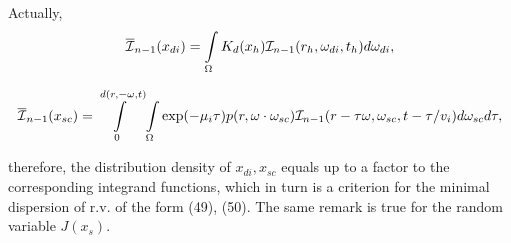 \documentclass[12pt,reqno]{report}
\begin{document}
Actually,
\begin{equation}
{\overline{\cal I}_{n-1}(x_{di})} = 
\int\limits_{\Omega} K_d(x_h) {\cal I}_{n-1}(r_h, \omega_{di}, t_h)d\omega_{di},
\end{equation}

\begin{equation}
{\overline{\cal I}_{n-1}(x_{sc})} = 
\int \limits^{d(r,-\omega,t)}_0 \int\limits_{\Omega} \exp(- \mu_i \tau) 
p(r,\omega \cdot\omega_{sc}) {\cal I}_{n-1}(r-\tau\omega,\omega_{sc},t-\tau/v_i)d\omega_{sc}d\tau ,
\end{equation}

therefore, the distribution density of $x_{di}, x_{sc}$ equals up to a factor to the
corresponding integrand functions,
which in turn is a criterion for the minimal dispersion of r.v. of the form (49), (50).
The same remark is true for the random variable $J(x_s)$.
\end{document}
